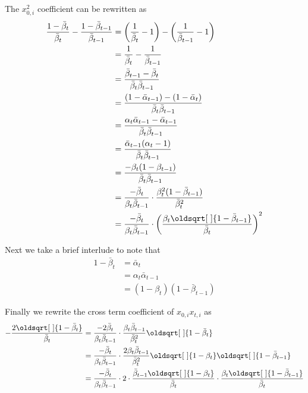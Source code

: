 \documentclass[11pt,dvipsnames]{article}
\renewcommand*{\sqrt}[2][\ ]{\oldsqrt[#1]{#2}}
\begin{document}
The $x_{0,i}^2$ coefficient can be rewritten as
\begin{equation*}
\begin{split}
\frac{1 - \bar\beta_t}{\bar\beta_t} - \frac{1 - \bar\beta_{t-1}}{\bar\beta_{t-1}} &= \left(\frac{1}{\bar\beta_t} - 1\right) - \left(\frac{1}{\bar\beta_{t-1}} - 1 \right) \\
&= \frac{1}{\bar\beta_t} - \frac{1}{\bar\beta_{t-1}} \\
&= \frac{\bar\beta_{t-1} - \bar\beta_t}{\bar\beta_t\bar\beta_{t-1}} \\
&= \frac{(1 - \bar\alpha_{t-1}) - (1 - \bar\alpha_t)}{\bar\beta_t\bar\beta_{t-1}} \\
&= \frac{\alpha_t\bar\alpha_{t-1} - \bar\alpha_{t-1}}{\bar\beta_t \bar\beta_{t-1}} \\
&= \frac{\bar\alpha_{t-1} (\alpha_t - 1)}{\bar\beta_t \bar\beta_{t-1}} \\
&= \frac{-\beta_t (1 - \beta_{t-1})}{\bar\beta_t \bar\beta_{t-1}} \\
&= \frac{-\bar\beta_t}{\beta_t\bar\beta_{t-1}} \cdot \frac{\beta_t^2 (1 - \bar\beta_{t-1})}{\bar\beta_t^2} \\
&= \frac{-\bar\beta_t}{\beta_t\bar\beta_{t-1}} \cdot \left( \frac{\beta_t \sqrt{1 - \bar\beta_{t-1}}}{\bar\beta_t} \right)^2
\end{split}
\end{equation*}

Next we take a brief interlude to note that
\begin{equation*}
\begin{split}
1 - \bar\beta_t &= \bar\alpha_t \\
&= \alpha_t \bar\alpha_{t-1} \\
&= (1 - \beta_t)(1 - \bar\beta_{t-1})
\end{split}
\end{equation*}

Finally we rewrite the cross term coefficient of $x_{0,i} x_{t, i}$ as
\begin{equation*}
\begin{split}
- \frac{2\sqrt{1 - \bar\beta_t}}{\bar\beta_t} &= \frac{-2\bar\beta_t}{\beta_t\bar\beta_{t-1}} \cdot \frac{\beta_t \bar\beta_{t-1}}{\bar\beta_t^2} \sqrt{1 - \bar\beta_t} \\
&=  \frac{-\bar\beta_t}{\beta_t\bar\beta_{t-1}} \cdot \frac{2\beta_t \bar\beta_{t-1}}{\bar\beta_t^2} \sqrt{1 - \beta_t} \sqrt{1 - \bar\beta_{t-1}} \\
&= \frac{-\bar\beta_t}{\beta_t\bar\beta_{t-1}} \cdot 2 \cdot \frac{\bar\beta_{t-1}\sqrt{1 - \beta_t}}{\bar\beta_t} \cdot \frac{\beta_t\sqrt{1 - \bar\beta_{t-1}}}{\bar\beta_t}
\end{split}
\end{equation*}
\end{document}
